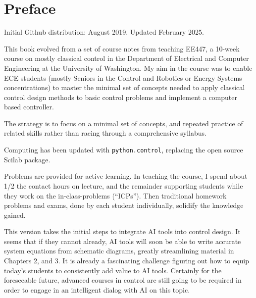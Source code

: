 \chapter*{Preface}

Initial Github distribution: August 2019. Updated February 2025.
\vspace{0.25in}

This book evolved from a set of course notes from teaching EE447,
a 10-week course on mostly classical control in the Department of Electrical and Computer Engineering at the University of Washington. My aim in the course was to enable ECE students (mostly Seniors in the Control and Robotics or Energy Systems concentrations) to  master the minimal set of concepts needed to apply  classical control design methods to basic control problems and implement a computer based controller.

The strategy is to focus on a minimal set of concepts, and repeated practice of related skills rather than racing through a comprehensive syllabus.

Computing has been updated with {\tt python.control}, replacing the open source Scilab package.


Problems are provided for active learning.  In teaching the course, I spend about 1/2 the contact
hours on lecture, and the remainder supporting students while they work on the in-class-problems (``ICPs'').   Then traditional
homework problems and exams, done by each student individually,
solidify the knowledge gained.

This version takes the initial steps to integrate AI tools into control design.   It seems that if they
cannot already, AI tools will soon be able to write accurate system equations from schematic diagrams,
greatly streamlining material in Chapters 2, and 3.   It is already a fascinating challenge figuring
out how to
equip today's students to consistently add value to AI tools.   Certainly for the foreseeable future,
advanced courses in control are still going to be required in order to engage in an intelligent dialog
with AI on this topic.


